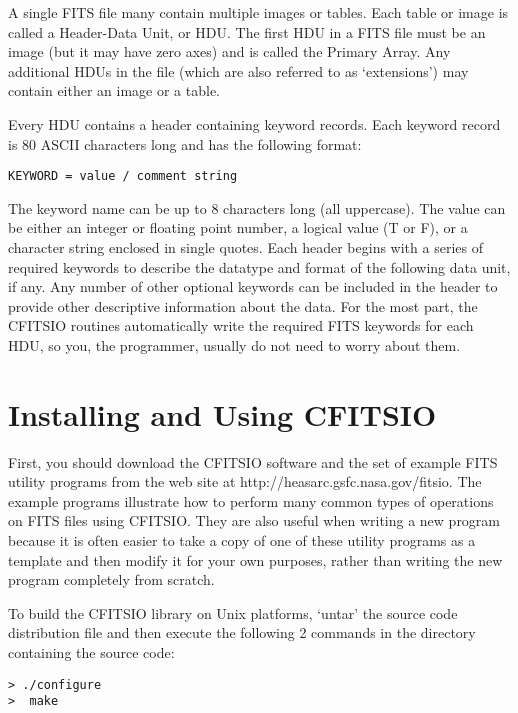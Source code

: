\documentclass[11pt]{article}
\begin{document}
A single FITS file many contain multiple images or tables.  Each table
or image is called a Header-Data Unit, or HDU.  The first HDU in a FITS
file must be an image (but it may have zero axes) and is called the
Primary Array.  Any additional HDUs in the file (which are also
referred to as `extensions') may contain either an image or a table.

Every HDU contains a header containing keyword records.  Each keyword
record is 80 ASCII characters long and has the following format:

\begin{verbatim}
KEYWORD = value / comment string
\end{verbatim}

The keyword name can be up to 8 characters long (all uppercase).  The
value can be either an integer or floating point number, a logical
value (T or F), or a character string enclosed in single quotes.  Each
header begins with a series of required keywords to describe the
datatype and format of the following data unit, if any.  Any number of
other optional keywords can be included in  the header to provide other
descriptive information about the data.  For the most part, the CFITSIO
routines automatically write the required FITS keywords for each HDU,
so you, the programmer, usually do not need to worry about them.

\section{Installing and Using CFITSIO}

First, you should download the CFITSIO software and the set of example
FITS utility programs from the web site at
http://heasarc.gsfc.nasa.gov/fitsio.  The example programs illustrate
how to perform many common types of operations on FITS files using
CFITSIO.  They are also useful when writing a new program because it is
often easier to take a copy of one of these utility programs as a
template and then modify it for your own purposes, rather than writing
the new program completely from scratch.

To build the CFITSIO library on Unix platforms, `untar' the source code
distribution file and then execute the following 2 commands in the
directory containing the source code:

\begin{verbatim}
> ./configure
>  make
\end{verbatim}
\end{document}
